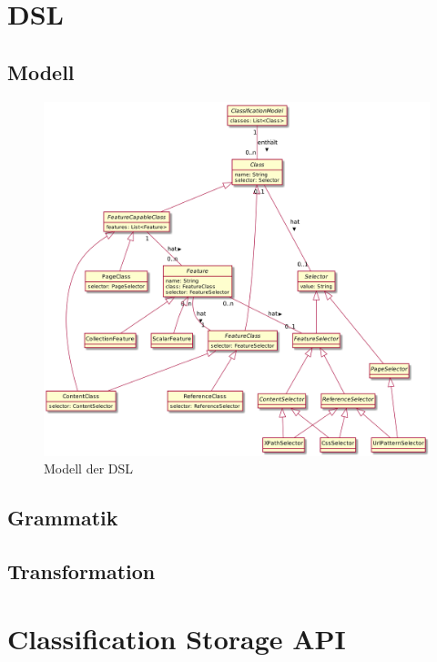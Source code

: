 \section{DSL}
    \label{appendix:dsl}
    \subsection{Modell}
        \begin{figure}[htb]
            \centering
            \includegraphics[scale=\imageScalingFactor]{../resources/dsl/model.png}
            \caption{Modell der DSL}
            \label{image:dslCompleteModel}
        \end{figure}
    
    \subsection{Grammatik}
        

    \subsection{Transformation}
        

\section{Classification Storage API}
    